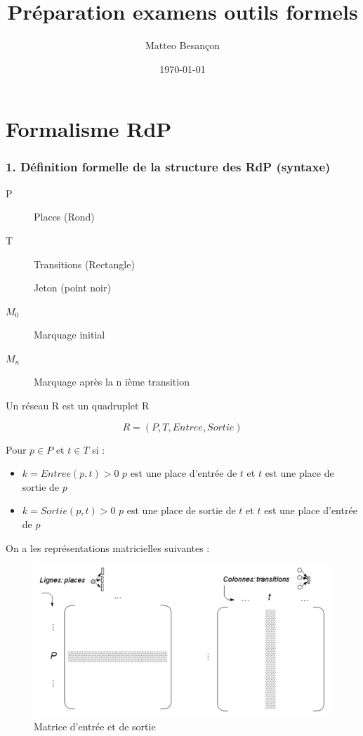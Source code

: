 \documentclass[12pt,a4paper,oneside]{article}
\author{Matteo Besançon}
\title {Préparation examens outils formels}
\date{\today}
\begin{document}
	\maketitle

\section{Formalisme RdP}
	\subsubsection*{1. Définition formelle de la structure des RdP (syntaxe)}
		\begin{description}
			\item [P] Places (Rond)
			\item [T] Transitions (Rectangle)
			\item [ ] Jeton (point noir)
			\item [$M_0$] Marquage initial
			\item [$M_n$] Marquage après la n ième transition
		\end{description}

		Un réseau R est un quadruplet R

		$$R = (P,T, Entree, Sortie)$$

		Pour $p \in P$ et $t \in T$ si :
		\begin{itemize}
			\item $k = Entree(p,t) > 0$ $p$ est une place d'entrée de $t$ et $t$ est une place de sortie de $p$
			\item $k = Sortie(p,t) > 0$ $p$ est une place de sortie de $t$ et $t$ est une place d'entrée de $p$
		\end{itemize}

		On a les représentations matricielles suivantes :

		\begin{figure}[H]
			\includegraphics[scale = 0.4]{./img/entree.png}
			\centering
			\caption{Matrice d'entrée et de sortie}
			\label{entreeSortie}
		\end{figure}
\end{document}
